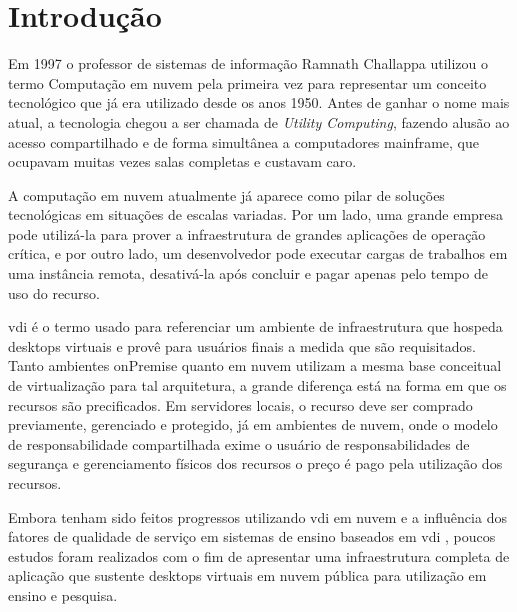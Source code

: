 
\chapter{Introdução}
\label{cap:introducao}


Em 1997 o professor de sistemas de informação Ramnath Challappa utilizou o termo Computação em nuvem
pela primeira vez para representar um conceito tecnológico que já era utilizado desde os anos 1950.
Antes de ganhar o nome mais atual, a tecnologia chegou a ser chamada de \textit{Utility Computing},
fazendo alusão ao acesso compartilhado e de forma simultânea a computadores mainframe, que ocupavam
muitas vezes salas completas e custavam caro. \citep{dellcloud}

A computação em nuvem atualmente já aparece como pilar de soluções tecnológicas em situações de
escalas variadas. Por um lado, uma grande empresa pode utilizá-la para prover a infraestrutura de
grandes aplicações de operação crítica, e por outro lado, um desenvolvedor pode executar cargas de
trabalhos em uma instância remota, desativá-la após concluir e pagar apenas pelo tempo de uso do
recurso. \citep{taurioncloud}

\gls{vdi} é o termo usado para referenciar um ambiente de infraestrutura que hospeda \glspl{desktop}
virtuais e provê para usuários finais a medida que são requisitados. Tanto ambientes \gls{onPremise}
quanto em nuvem utilizam a mesma base conceitual de virtualização para tal arquitetura, a grande
diferença está na forma em que os recursos são precificados. Em servidores locais, o recurso deve
ser comprado previamente, gerenciado e protegido, já em ambientes de nuvem, onde o modelo de
responsabilidade compartilhada exime o usuário de responsabilidades de segurança e gerenciamento
físicos dos recursos o preço é pago pela utilização dos recursos. \citep{vmwarevdi}

Embora tenham sido feitos progressos utilizando \gls{vdi} em nuvem e a influência dos fatores de
qualidade de serviço em sistemas de ensino baseados em \gls{vdi} \citep{qoselearning}, poucos
estudos foram realizados com o fim de apresentar uma infraestrutura completa de aplicação que
sustente \glspl{desktop} virtuais em nuvem pública para utilização em ensino e pesquisa.


